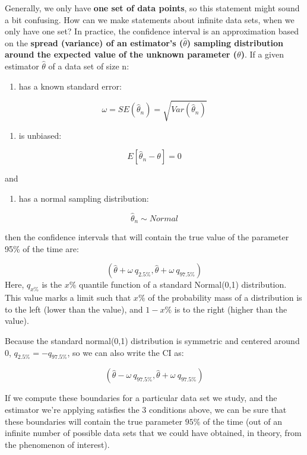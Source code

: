 \documentclass[
]{book}
\providecommand{\tightlist}{%
  \setlength{\itemsep}{0pt}\setlength{\parskip}{0pt}}
\begin{document}
Generally, we only have \textbf{one set of data points}, so this statement might sound a bit confusing. How can we make statements about infinite data sets, when we only have one set? In practice, the confidence interval is an approximation based on the \textbf{spread (variance) of an estimator's (\(\hat{\theta}\)) sampling distribution around the expected value of the unknown parameter (\(\theta\))}.
If a given estimator \(\hat{\theta}\) of a data set of size n:

\begin{enumerate}
\def\labelenumi{\arabic{enumi}.}
\tightlist
\item
  has a known standard error:
\end{enumerate}

\[\omega = SE(\hat{\theta}_n) = \sqrt{Var(\hat{\theta}_n)}\]

\begin{enumerate}
\def\labelenumi{\arabic{enumi}.}
\setcounter{enumi}{1}
\tightlist
\item
  is unbiased:
\end{enumerate}

\[E[\hat{\theta}_n - \theta] = 0\]

and

\begin{enumerate}
\def\labelenumi{\arabic{enumi}.}
\setcounter{enumi}{2}
\tightlist
\item
  has a normal sampling distribution:
\end{enumerate}

\[\hat{\theta}_n \sim Normal\]

then the confidence intervals that will contain the true value of the parameter 95\% of the time are:

\[(\hat{\theta} + \omega\  q_{2.5\%}, \hat{\theta} + \omega\ q_{97.5\%})\]
Here, \(q_{x\%}\) is the \(x\%\) quantile function of a standard Normal(0,1) distribution. This value marks a limit such that \(x\%\) of the probability mass of a distribution is to the left (lower than the value), and \(1-x\%\) is to the right (higher than the value).

Because the standard normal(0,1) distribution is symmetric and centered around 0, \(q_{2.5\%} = -q_{97.5\%}\), so we can also write the CI as:

\[(\hat{\theta} - \omega\  q_{97.5\%}, \hat{\theta} + \omega\ q_{97.5\%})\]

If we compute these boundaries for a particular data set we study, and the estimator we're applying satisfies the 3 conditions above, we can be sure that these boundaries will contain the true parameter \(95\%\) of the time (out of an infinite number of possible data sets that we could have obtained, in theory, from the phenomenon of interest).
\end{document}
